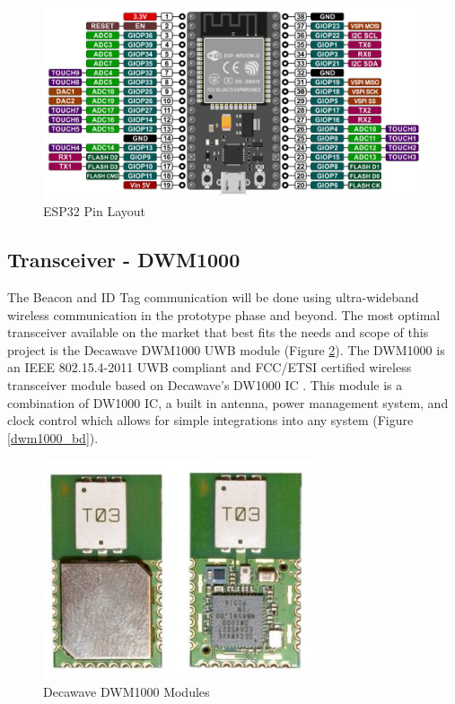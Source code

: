 \medskip
\begin{figure}[H]
\centering
    \includegraphics[scale=0.5]{./images/esp32_pin.png}
    \caption{ESP32 Pin Layout}
    \label{esp_pin}
\end{figure}


\pagebreak
\subsection{Transceiver - DWM1000} 
\medskip
The Beacon and ID Tag communication will be done using ultra-wideband wireless communication in the prototype phase and beyond. The most optimal transceiver available on the market that best fits the needs and scope of this project is the Decawave DWM1000 UWB module (Figure \ref{dwm1000}). The DWM1000 is an IEEE 802.15.4-2011 UWB compliant and \Gls{FCC}/\Gls{ETSI} certified wireless transceiver module based on Decawave’s DW1000 IC \cite{R4-2-1}. This module is a combination of DW1000 IC, a built in antenna, power management system, and clock control which allows for simple integrations into any system (Figure \ref{dwm1000_bd}). 

\medskip
\begin{figure}[H]
\centering
    \includegraphics[scale=0.75]{./images/dwm1000.jpg}
    \caption{Decawave DWM1000 Modules}
    \label{dwm1000}
\end{figure}

